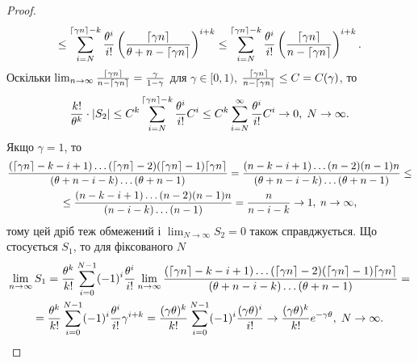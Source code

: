 \begin{proof}
\begin{gather*}
        \leq 
        \sum_{i=N}^{\ceil*{\gamma n}-k}
        \frac{\theta^i}{i!}
        \left(\frac{
            \ceil*{\g n}
        }{
            \theta + n - \ceil*{\g n}
        }\right)^{i+k} \leq 
        \sum_{i=N}^{\ceil*{\gamma n}-k}
        \frac{\theta^i}{i!}
        \left(\frac{
            \ceil*{\g n}
        }{
            n - \ceil*{\g n}
        }\right)^{i+k}.
    \end{gather*}
    Оскільки $\lim_{n\to\infty} \frac{
        \ceil*{\g n}
    }{
        n - \ceil*{\g n}
    } = \frac{\gamma}{1-\gamma}$ для $\gamma \in [0, 1)$,
    $\frac{
        \ceil*{\g n}
    }{
        n - \ceil*{\g n}
    } \leq C = C(\gamma)$, то
    \begin{gather*}
        \frac{k!}{\theta^k} \cdot |S_2| \leq C^k
        \sum_{i=N}^{\ceil*{\gamma n}-k}
        \frac{\theta^i}{i!} C^i \leq
        C^k
        \sum_{i=N}^{\infty}
        \frac{\theta^i}{i!} C^i \to 0, \; N \to \infty.
    \end{gather*}
    Якщо $\gamma = 1$, то
    \begin{gather*}
        \frac{
            (\ceil*{\g n} - k - i + 1) \dots (\ceil*{\g n} - 2) (\ceil*{\g n} - 1) \ceil*{\g n}
        }{
            (\theta + n - i - k) \dots (\theta + n - 1)
        } = 
        \frac{
            (n - k - i + 1) \dots (n - 2) (n - 1) n
        }{
            (\theta + n - i - k) \dots (\theta + n - 1)
        } \leq \\ \leq
        \frac{
            (n - k - i + 1) \dots (n - 2) (n - 1) n
        }{
            (n - i - k) \dots (n - 1)
        } = \frac{n}{n - i - k} \to 1, \; n\to\infty,
    \end{gather*}
    тому цей дріб теж обмежений і
    $\lim_{N\to\infty} S_2 = 0$ також справджується.
    Що стосується $S_1$, то для фіксованого $N$
    \begin{gather*}
        \lim_{n\to\infty} S_1 = \frac{\theta^k}{k!} \sum_{i=0}^{N-1} (-1)^i
        \frac{\theta^i}{i!} \lim_{n\to\infty} 
        \frac{
            (\ceil*{\g n} - k - i + 1) \dots (\ceil*{\g n} - 2) (\ceil*{\g n} - 1) \ceil*{\g n}
        }{
            (\theta + n - i - k) \dots (\theta + n - 1)
        } = \\ =
        \frac{\theta^k}{k!} \sum_{i=0}^{N-1} (-1)^i
        \frac{\theta^i}{i!} \gamma^{i+k} = 
        \frac{(\gamma\theta)^k}{k!} \sum_{i=0}^{N-1} (-1)^i
        \frac{(\gamma\theta)^i}{i!} \to \frac{(\gamma\theta)^k}{k!}e^{-\gamma\theta}, \; N\to\infty.
    \end{gather*}
\end{proof}

